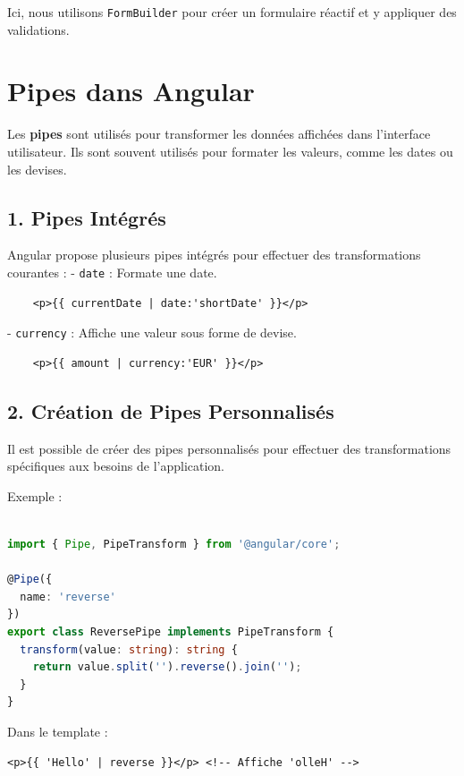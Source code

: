 \documentclass{article}
\begin{document}
Ici, nous utilisons \texttt{FormBuilder} pour créer un formulaire réactif et y appliquer des validations.

\section*{Pipes dans Angular}

Les \textbf{pipes} sont utilisés pour transformer les données affichées dans l'interface utilisateur. Ils sont souvent utilisés pour formater les valeurs, comme les dates ou les devises.

\subsection*{1. Pipes Intégrés}

Angular propose plusieurs pipes intégrés pour effectuer des transformations courantes :
- \texttt{date} : Formate une date.
    \begin{verbatim}
    <p>{{ currentDate | date:'shortDate' }}</p>
    \end{verbatim}
  
- \texttt{currency} : Affiche une valeur sous forme de devise.
    \begin{verbatim}
    <p>{{ amount | currency:'EUR' }}</p>
    \end{verbatim}

\subsection*{2. Création de Pipes Personnalisés}

Il est possible de créer des pipes personnalisés pour effectuer des transformations spécifiques aux besoins de l’application.

Exemple :
\begin{lstlisting}[language=TypeScript, caption={Using a service in a component}, label={lst:typescript-service-usage}]

import { Pipe, PipeTransform } from '@angular/core';

@Pipe({
  name: 'reverse'
})
export class ReversePipe implements PipeTransform {
  transform(value: string): string {
    return value.split('').reverse().join('');
  }
}
\end{lstlisting}

Dans le template :
\begin{verbatim}
<p>{{ 'Hello' | reverse }}</p> <!-- Affiche 'olleH' -->
\end{verbatim}
\end{document}
